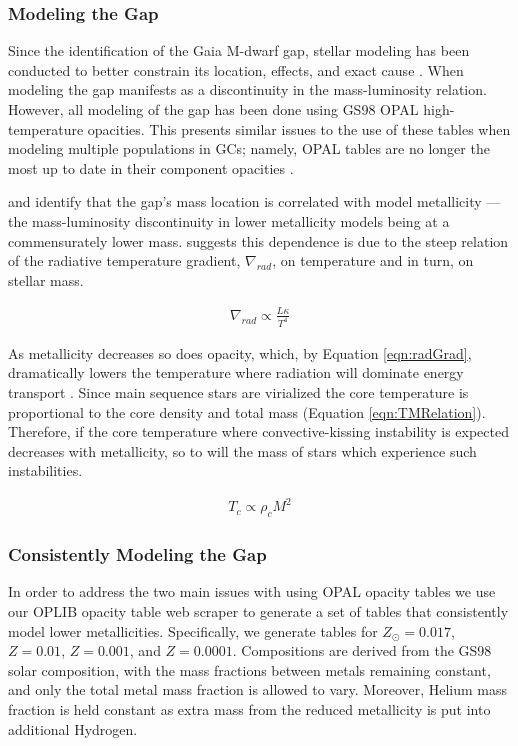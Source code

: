 \subsubsection{Modeling the Gap}
Since the identification of the Gaia M-dwarf gap, stellar modeling has been
conducted to better constrain its location, effects, and exact cause
\citep[e.g.][]{Mansfield2021, Feiden2021}. When modeling the gap manifests as a
discontinuity in the mass-luminosity relation. However, all modeling of the gap
has been done using GS98 OPAL high-temperature opacities. This presents similar
issues to the use of these tables when modeling multiple populations in GCs;
namely, OPAL tables are no longer the most up to date in their component
opacities . 

\citet{Mansfield2021} and \citet{Feiden2021} identify that the gap's mass
location is correlated with model metallicity --- the mass-luminosity
discontinuity in lower metallicity models being at a commensurately lower mass.
\citet{Feiden2021} suggests this dependence is due to the steep relation of
the radiative temperature gradient, $\nabla_{rad}$, on temperature and in turn,
on stellar mass.

\begin{align}\label{eqn:radGrad}
	\nabla_{rad} \propto \frac{L\kappa}{T^{4}}
\end{align}

As metallicity decreases so does opacity, which, by Equation \ref{eqn:radGrad},
dramatically lowers the temperature where radiation will dominate energy transport
\citep{Chabrier1997}. Since main sequence stars are virialized the core
temperature is proportional to the core density and total mass (Equation
\ref{eqn:TMRelation}). Therefore, if the core temperature where
convective-kissing instability is expected decreases with metallicity, so to
will the mass of stars which experience such instabilities.

\begin{align}\label{eqn:TMRelation}
	T_{c} \propto \rho_{c}M^{2}
\end{align}

\subsubsection{Consistently Modeling the Gap}
In order to address the two main issues with using OPAL opacity tables we use
our OPLIB opacity table web scraper to generate a set of tables that
consistently model lower metallicities. Specifically, we generate tables for
$Z_{\odot}=0.017$, $Z=0.01$, $Z=0.001$, and $Z=0.0001$. Compositions are
derived from the GS98 solar composition, with the mass fractions between metals
remaining constant, and only the total metal mass fraction is allowed to vary.
Moreover, Helium mass fraction is held constant as extra mass from the reduced
metallicity is put into additional Hydrogen. 

